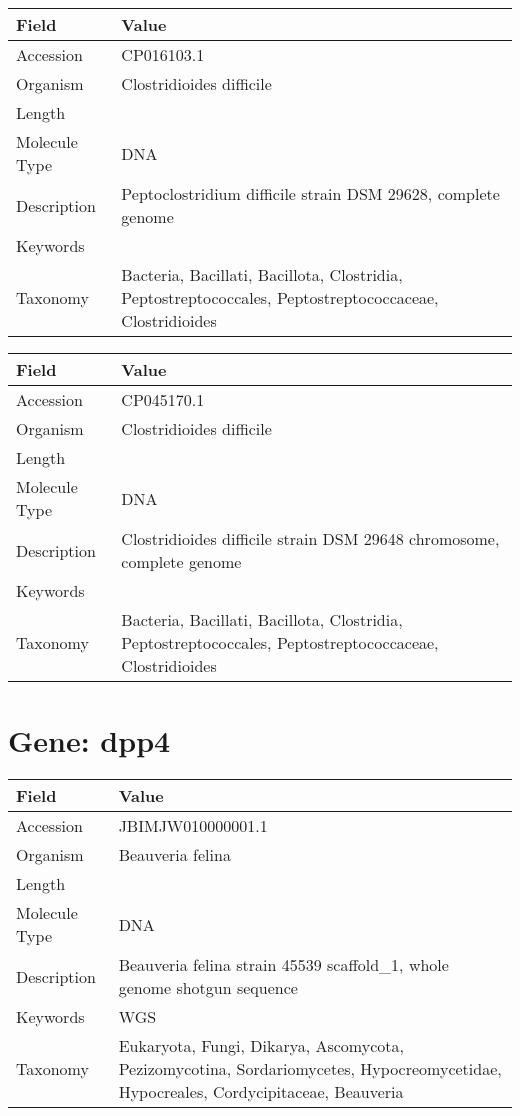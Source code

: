 \documentclass[10pt]{article}
\begin{document}
{\footnotesize
\begin{longtable}{>{\raggedright\arraybackslash}p{4.5cm} >{\raggedright\arraybackslash}p{11.5cm}}
\textbf{Field} & \textbf{Value} \\
\hline
Accession & CP016103.1 \\
Organism & Clostridioides difficile \\
Length & 4253996 \\
Molecule Type & DNA \\
Description & Peptoclostridium difficile strain DSM 29628, complete genome \\
Keywords &  \\
Taxonomy & Bacteria, Bacillati, Bacillota, Clostridia, Peptostreptococcales, Peptostreptococcaceae, Clostridioides \\
\end{longtable}
}

{\footnotesize
\begin{longtable}{>{\raggedright\arraybackslash}p{4.5cm} >{\raggedright\arraybackslash}p{11.5cm}}
\textbf{Field} & \textbf{Value} \\
\hline
Accession & CP045170.1 \\
Organism & Clostridioides difficile \\
Length & 4250841 \\
Molecule Type & DNA \\
Description & Clostridioides difficile strain DSM 29648 chromosome, complete genome \\
Keywords &  \\
Taxonomy & Bacteria, Bacillati, Bacillota, Clostridia, Peptostreptococcales, Peptostreptococcaceae, Clostridioides \\
\end{longtable}
}


\section*{Gene: dpp4}
{\footnotesize
\begin{longtable}{>{\raggedright\arraybackslash}p{4.5cm} >{\raggedright\arraybackslash}p{11.5cm}}
\textbf{Field} & \textbf{Value} \\
\hline
Accession & JBIMJW010000001.1 \\
Organism & Beauveria felina \\
Length & 4728797 \\
Molecule Type & DNA \\
Description & Beauveria felina strain 45539 scaffold\_1, whole genome shotgun sequence \\
Keywords & WGS \\
Taxonomy & Eukaryota, Fungi, Dikarya, Ascomycota, Pezizomycotina, Sordariomycetes, Hypocreomycetidae, Hypocreales, Cordycipitaceae, Beauveria \\
\end{longtable}
}
\end{document}
